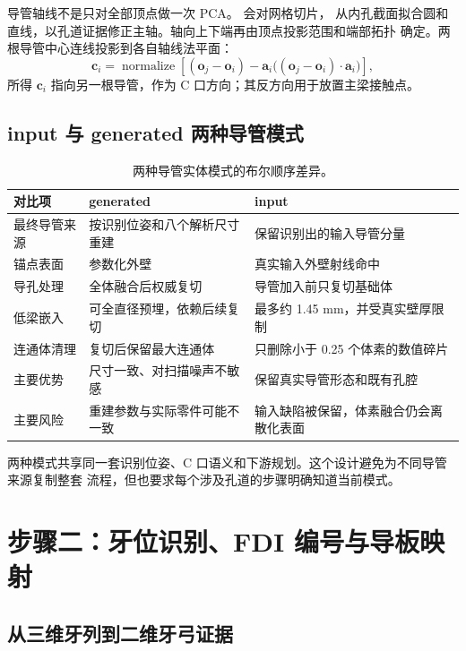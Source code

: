 导管轴线不是只对全部顶点做一次 PCA。 会对网格切片，
从内孔截面拟合圆和直线，以孔道证据修正主轴。轴向上下端再由顶点投影范围和端部拓扑
确定。两根导管中心连线投影到各自轴线法平面：
\[
  \mathbf c_i=
  \operatorname{normalize}\!\left[
  (\mathbf o_j-\mathbf o_i)-
  \mathbf a_i\big((\mathbf o_j-\mathbf o_i)\cdot\mathbf a_i\big)
  \right],
\]
所得 $\mathbf c_i$ 指向另一根导管，作为 C 口方向；其反方向用于放置主梁接触点。

\subsection{input 与 generated 两种导管模式}

\begin{table}[H]
\centering
\small
\begin{tabularx}{\textwidth}{p{}XX}
  \toprule
  对比项 & generated & input\\
  \midrule
  最终导管来源 & 按识别位姿和八个解析尺寸重建 & 保留识别出的输入导管分量\\
  锚点表面 & 参数化外壁 & 真实输入外壁射线命中\\
  导孔处理 & 全体融合后权威复切 & 导管加入前只复切基础体\\
  低梁嵌入 & 可全直径预埋，依赖后续复切 & 最多约 1.45 mm，并受真实壁厚限制\\
  连通体清理 & 复切后保留最大连通体 & 只删除小于 0.25 个体素的数值碎片\\
  主要优势 & 尺寸一致、对扫描噪声不敏感 & 保留真实导管形态和既有孔腔\\
  主要风险 & 重建参数与实际零件可能不一致 & 输入缺陷被保留，体素融合仍会离散化表面\\
  \bottomrule
\end{tabularx}
\caption{两种导管实体模式的布尔顺序差异。}
\end{table}

两种模式共享同一套识别位姿、C 口语义和下游规划。这个设计避免为不同导管来源复制整套
流程，但也要求每个涉及孔道的步骤明确知道当前模式。

\section{步骤二：牙位识别、FDI 编号与导板映射}

\subsection{从三维牙列到二维牙弓证据}

